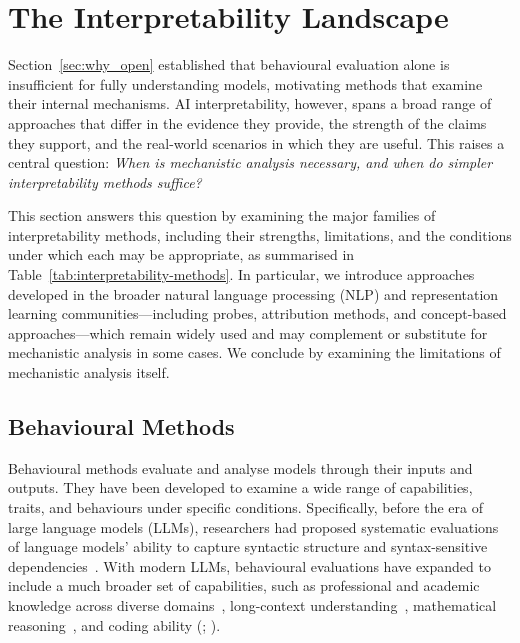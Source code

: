 \section{The Interpretability Landscape}
\label{sec:interpretability-landscape}

Section~\ref{sec:why_open} established that behavioural evaluation alone is insufficient for fully understanding models, motivating methods that examine their internal mechanisms. AI interpretability, however, spans a broad range of approaches that differ in the evidence they provide, the strength of the claims they support, and the real-world scenarios in which they are useful. This raises a central question: \textit{When is mechanistic analysis necessary, and when do simpler interpretability methods suffice?}

This section answers this question by examining the major families of interpretability methods, including their strengths, limitations, and the conditions under which each may be appropriate, as summarised in Table~\ref{tab:interpretability-methods}. In particular, we introduce approaches developed in the broader natural language processing (NLP) and representation learning communities---including probes, attribution methods, and concept-based approaches---which remain widely used and may complement or substitute for mechanistic analysis in some cases. We conclude by examining the limitations of mechanistic analysis itself.

\subsection{Behavioural Methods}

Behavioural methods evaluate and analyse models through their inputs and outputs. They have been developed to examine a wide range of capabilities, traits, and behaviours under specific conditions. Specifically, before the era of large language models (LLMs), researchers had proposed systematic evaluations of language models' ability to capture syntactic structure and syntax-sensitive dependencies~. With modern LLMs, behavioural evaluations have expanded to include a much broader set of capabilities, such as professional and academic knowledge across diverse domains~, long-context understanding~, mathematical reasoning~, and coding ability (; ).

